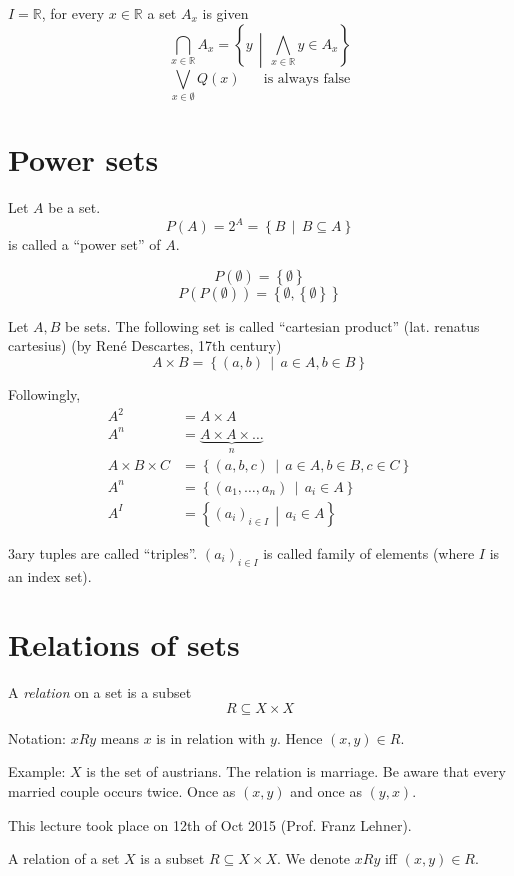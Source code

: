 \documentclass[a4paper,landscape,twocolumn]{article}
\newcommand\meta[3]{This #1 took place on #2 (#3).\par}
\newcommand\set[1]{\left\{#1\right\}}
\newcommand\setdef[2]{\left\{#1\,\middle|\,#2\right\}}
\newcommand\mathspace{\hspace{20pt}}
\begin{document}
$I = \mathbb{R}$, for every $x \in \mathbb{R}$ a set $A_x$ is given
\[ \bigcap_{x \in \mathbb{R}} A_x = \setdef{y}{\bigwedge_{x \in \mathbb{R}} y \in A_x} \]
\[ \bigvee_{x \in \emptyset} Q(x) \mathspace\text{is always false} \]

\section{Power sets}

Let $A$ be a set.
\[ P(A) = 2^A = \setdef{B}{B \subseteq A} \]
is called a \enquote{power set} of $A$.

\[ P(\emptyset) = \set{\emptyset} \]
\[ P(P(\emptyset)) = \set{\emptyset, \set{\emptyset}} \]

Let $A, B$ be sets.
The following set is called \enquote{cartesian product} (lat. renatus cartesius) (by René Descartes, 17th century)
\[ A \times B = \setdef{(a, b)}{a \in A, b \in B} \]

Followingly,
\begin{align*}
  A^2 &= A \times A \\
  A^n &= \underbrace{A \times A \times \ldots}_{n} \\
  A \times B \times C &= \setdef{(a, b, c)}{a \in A, b \in B, c \in C} \\
  A^n &= \setdef{(a_1, \ldots, a_n)}{a_i \in A} \\
  A^I &= \setdef{(a_i)_{i \in I}}{a_i \in A}
\end{align*}

3ary tuples are called \enquote{triples}.
$(a_i)_{i \in I}$ is called family of elements (where $I$ is an index set).

\section{Relations of sets}

A \emph{relation} on a set is a subset
\[ R \subseteq X \times X \]

Notation: $x R y$ means $x$ is in relation with $y$. Hence $(x, y) \in R$.

Example: $X$ is the set of austrians. The relation is marriage.
  Be aware that every married couple occurs twice. Once as $(x, y)$ and once as $(y, x)$.

\meta{lecture}{12th of Oct 2015}{Prof. Franz Lehner}

A relation of a set $X$ is a subset $R \subseteq X \times X$. We denote $x R y$ iff $(x,y) \in R$.
\end{document}
